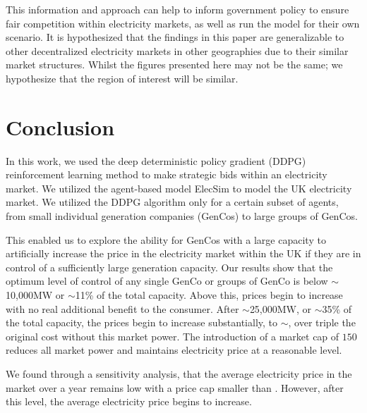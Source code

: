 \documentclass[conference]{IEEEtran}
\begin{document}

This information and approach can help to inform government policy to ensure fair competition within electricity markets, as well as run the model for their own scenario. It is hypothesized that the findings in this paper are generalizable to other decentralized electricity markets in other geographies due to their similar market structures. Whilst the figures presented here may not be the same; we hypothesize that the region of interest will be similar.



\section{Conclusion}
\label{sec:conclusion}

In this work, we used the deep deterministic policy gradient (DDPG) reinforcement learning method to make strategic bids within an electricity market. We utilized the agent-based model ElecSim to model the UK electricity market. We utilized the DDPG algorithm only for a certain subset of agents, from small individual generation companies (GenCos) to large groups of GenCos. 

This enabled us to explore the ability for GenCos with a large capacity to artificially increase the price in the electricity market within the UK if they are in control of a sufficiently large generation capacity. Our results show that the optimum level of control of any single GenCo or groups of GenCo is below ${\sim}$10,000MW or ${\sim}$11\% of the total capacity. Above this, prices begin to increase with no real additional benefit to the consumer. After ${\sim}$25,000MW, or ${\sim}$35\% of the total capacity, the prices begin to increase substantially, to ${\sim}$, over triple the original cost without this market power. The introduction of a market cap of \textsterling$150$ reduces all market power and maintains electricity price at a reasonable level.

We found through a sensitivity analysis, that the average electricity price in the market over a year remains low with a price cap smaller than . However, after this level, the average electricity price begins to increase.
\end{document}
